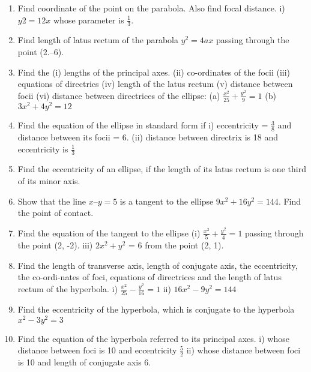 \documentclass[17pt]{extarticle}
\begin{document}
\begin{multicols}{2}
\begin{enumerate}
\item Find coordinate of the point on the parabola. Also find focal distance. i) $y 2 = 12x$ whose parameter is $\frac{1}{3}$.
 
\item Find length of latus rectum of the parabola $y^2 = 4ax$ passing through the point (2.–6).

\item Find the (i) lengths of the principal axes. (ii) co-ordinates of the focii (iii) equations of directrics (iv) length of the latus rectum (v) distance between focii (vi) distance between directrices of the ellipse: 
(a) $\frac{x^2}{25} + \frac{y^2}{9} = 1$ (b) $3x^2 + 4y^2 = 12$

\item Find the equation of the 		 ellipse in standard form if
i) eccentricity = $\frac{3}{8}$ and distance between its focii = 6.
(ii) distance between directrix is 18 and eccentricity is $\frac{1}{3}$

\item Find the eccentricity of an ellipse, if the length of its latus rectum is one third of its minor axis.

\item Show that the line $x – y = 5$ is a tangent to the ellipse $9x^2 + 16y^2 = 144$. Find the point of contact.

\item Find the equation of the tangent to the ellipse (i) $\frac{x^2}{5} + \frac{y^2}{4} = 1$ passing through the point (2, -2). iii) $2x^2 + y^2$ = 6 from the point (2, 1).

\item Find the length of transverse axis, length of conjugate axis, the eccentricity, the co-ordi-nates of foci, equations of directrices and the
length of latus rectum of the hyperbola. i) $\frac{x^2}{25}-\frac{y^2}{16} = 1$ ii) $16x^2 - 9y^2 = 144$

\item Find the eccentricity of the hyperbola, which is conjugate to the hyperbola $x^2 - 3y^2 = 3$

\item Find the equation of the hyperbola referred to its principal axes. i) whose distance between foci is 10 and eccentricity $\frac{5}{2}$
ii) whose distance between foci is 10 and length of conjugate axis 6.

\end{enumerate} 




\end{multicols}
 
\end{document}
